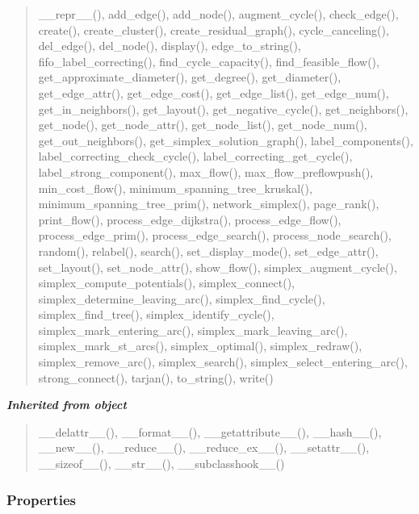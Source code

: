 \begin{quote}
\_\_repr\_\_(), add\_edge(), add\_node(), augment\_cycle(), check\_edge(), create(), create\_cluster(), create\_residual\_graph(), cycle\_canceling(), del\_edge(), del\_node(), display(), edge\_to\_string(), fifo\_label\_correcting(), find\_cycle\_capacity(), find\_feasible\_flow(), get\_approximate\_diameter(), get\_degree(), get\_diameter(), get\_edge\_attr(), get\_edge\_cost(), get\_edge\_list(), get\_edge\_num(), get\_in\_neighbors(), get\_layout(), get\_negative\_cycle(), get\_neighbors(), get\_node(), get\_node\_attr(), get\_node\_list(), get\_node\_num(), get\_out\_neighbors(), get\_simplex\_solution\_graph(), label\_components(), label\_correcting\_check\_cycle(), label\_correcting\_get\_cycle(), label\_strong\_component(), max\_flow(), max\_flow\_preflowpush(), min\_cost\_flow(), minimum\_spanning\_tree\_kruskal(), minimum\_spanning\_tree\_prim(), network\_simplex(), page\_rank(), print\_flow(), process\_edge\_dijkstra(), process\_edge\_flow(), process\_edge\_prim(), process\_edge\_search(), process\_node\_search(), random(), relabel(), search(), set\_display\_mode(), set\_edge\_attr(), set\_layout(), set\_node\_attr(), show\_flow(), simplex\_augment\_cycle(), simplex\_compute\_potentials(), simplex\_connect(), simplex\_determine\_leaving\_arc(), simplex\_find\_cycle(), simplex\_find\_tree(), simplex\_identify\_cycle(), simplex\_mark\_entering\_arc(), simplex\_mark\_leaving\_arc(), simplex\_mark\_st\_arcs(), simplex\_optimal(), simplex\_redraw(), simplex\_remove\_arc(), simplex\_search(), simplex\_select\_entering\_arc(), strong\_connect(), tarjan(), to\_string(), write()
\end{quote}

\large{\textbf{\textit{Inherited from object}}}

\begin{quote}
\_\_delattr\_\_(), \_\_format\_\_(), \_\_getattribute\_\_(), \_\_hash\_\_(), \_\_new\_\_(), \_\_reduce\_\_(), \_\_reduce\_ex\_\_(), \_\_setattr\_\_(), \_\_sizeof\_\_(), \_\_str\_\_(), \_\_subclasshook\_\_()
\end{quote}


  \subsubsection{Properties}

